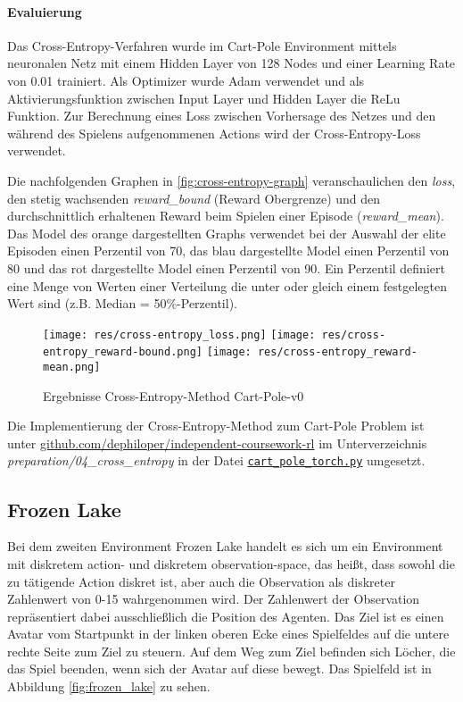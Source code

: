 \documentclass[11pt]{scrartcl}
\begin{document}
\paragraph*{Evaluierung}
\noindent
\newline
Das Cross-Entropy-Verfahren wurde im Cart-Pole Environment mittels neuronalen Netz mit
einem Hidden Layer von 128 Nodes und einer Learning Rate von 0.01 trainiert. Als
Optimizer wurde Adam verwendet und als Aktivierungsfunktion zwischen Input Layer und
Hidden Layer die ReLu Funktion. Zur Berechnung eines Loss zwischen Vorhersage des Netzes
und den während des Spielens aufgenommenen Actions wird der Cross-Entropy-Loss verwendet.

Die nachfolgenden Graphen in \autoref{fig:cross-entropy-graph} veranschaulichen den
\textit{loss}, den stetig wachsenden \textit{reward\_bound} (Reward Obergrenze) und den
durchschnittlich erhaltenen Reward beim Spielen einer Episode (\textit{reward\_mean}).
Das Model des orange dargestellten Graphs verwendet bei der Auswahl der elite Episoden
einen Perzentil von 70, das blau dargestellte Model einen Perzentil von 80 und das
rot dargestellte Model einen Perzentil von 90. Ein Perzentil definiert eine Menge von
Werten einer Verteilung die unter oder gleich einem festgelegten Wert sind (z.B. Median 
= 50\%-Perzentil). 

\begin{figure}[htp]
\centering
\texttt{[image: res/cross-entropy\_loss.png]}
\texttt{[image: res/cross-entropy\_reward-bound.png]}
\texttt{[image: res/cross-entropy\_reward-mean.png]}
\caption{Ergebnisse Cross-Entropy-Method Cart-Pole-v0}
\label{fig:cross-entropy-graph}
\end{figure}

Die Implementierung der Cross-Entropy-Method zum Cart-Pole Problem ist unter
\url{github.com/dephiloper/independent-coursework-rl} im Unterverzeichnis 
\textit{preparation/04\_cross\_entropy} in der Datei
\href{https://github.com/dephiloper/independent-coursework-rl/blob/master/preparation/04_cross_entropy/cart_pole_torch.py}{\nolinkurl{cart\_pole\_torch.py}} umgesetzt.


\subsection{Frozen Lake}
\label{sec:frozen-lake}
Bei dem zweiten Environment Frozen Lake handelt es sich um ein Environment mit diskretem action-
und diskretem observation-space, das heißt, dass sowohl die zu tätigende Action diskret ist,
aber auch die Observation als diskreter Zahlenwert von 0-15 wahrgenommen wird. Der Zahlenwert
der Observation repräsentiert dabei ausschließlich die Position des Agenten. Das Ziel ist es
einen Avatar vom Startpunkt in der linken oberen Ecke eines Spielfeldes auf die untere rechte
Seite zum Ziel zu steuern. Auf dem Weg zum Ziel befinden sich Löcher, die das Spiel beenden, wenn
sich der Avatar auf diese bewegt. Das Spielfeld ist in Abbildung \ref{fig:frozen_lake} zu sehen.
\end{document}
